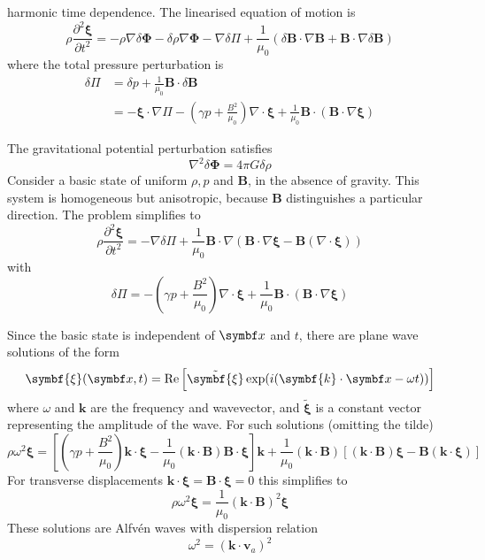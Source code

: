 \documentclass{jknotes}
\newcommand{\B}{\symbf{B}}
\newcommand{\flux}{\symbf{\Phi}}
\newcommand{\disp}{\symbf{\xi}}
\begin{document}
harmonic time dependence. The linearised equation of motion is
\begin{equation}
	\rho \frac{\partial^2 \disp}{\partial t^2} = -\rho \nabla \delta \flux -
	\delta \rho \nabla \flux - \nabla \delta \Pi + \frac{1}{\mu_0}(\delta \B
	\cdot \nabla \B + \B \cdot \nabla \delta \B)
	\label{eq:eom}
\end{equation}
where the total pressure perturbation is
\begin{align}
	\delta \Pi &= \delta p + \frac{1}{\mu_0}\B \cdot \delta \B \\
			   &= -\disp \cdot \nabla \Pi - \left(\gamma p +
			   \frac{B^2}{\mu_0}\right)\nabla \cdot \disp + \frac{1}{\mu_0} \B \cdot
			   (\B \cdot \nabla \disp)
\end{align}

The gravitational potential perturbation satisfies
\begin{equation}
	\nabla^2 \delta \flux = 4\pi G \delta \rho
\end{equation}
Consider a basic state of uniform $\rho, p$ and $\B$, in the absence of
gravity. This system is homogeneous but anisotropic, because $\B$
distinguishes a particular direction. The problem simplifies to
\begin{equation}
	\rho \frac{\partial^2 \disp}{\partial t^2} = -\nabla \delta \Pi +
	\frac{1}{\mu_0} \B \cdot \nabla (\B \cdot \nabla \disp - \B (\nabla \cdot
	\disp))
\end{equation}
with 
\begin{equation}
	\delta \Pi = -\left(\gamma p + \frac{B^2}{\mu_0}\right)\nabla \cdot \disp +
	\frac{1}{\mu_0}\B \cdot (\B \cdot \nabla \disp)
\end{equation}

Since the basic state is independent of $\x$ and $t$, there are plane wave
solutions of the form
\begin{equation}
	\disp(\x,t) = \Re \left[ \tilde{\disp}\exp(i(\symbf{k}\cdot\x - \omega t))
	\right]
\end{equation}
where $\omega$ and $\symbf{k}$ are the frequency and wavevector, and
$\tilde{\disp}$ is a constant vector representing the amplitude of the wave.
For such solutions (omitting the tilde)
\begin{equation}
	\rho \omega^2 \disp = \left[ \left(\gamma p +
	\frac{B^2}{\mu_0}\right)\symbf{k}\cdot\disp -
	\frac{1}{\mu_0}(\symbf{k}\cdot\B)\B\cdot\disp\right]\symbf{k} +
	\frac{1}{\mu_0}(\symbf{k}\cdot\B)\left[(\symbf{k}\cdot\B)\disp -
	\B(\symbf{k}\cdot\disp)\right]
	\label{eq:5:1}
\end{equation}
For transverse displacements $\symbf{k} \cdot \disp = \B \cdot \disp = 0$
this simplifies to
\begin{equation}
	\rho \omega^2 \disp = \frac{1}{\mu_0}(\symbf{k}\cdot\B)^2\disp
\end{equation}
These solutions are Alfv\'{e}n waves with dispersion relation
\begin{equation}
	\omega^2 = (\symbf{k}\cdot\symbf{v}_a)^2
\end{equation}
\end{document}
